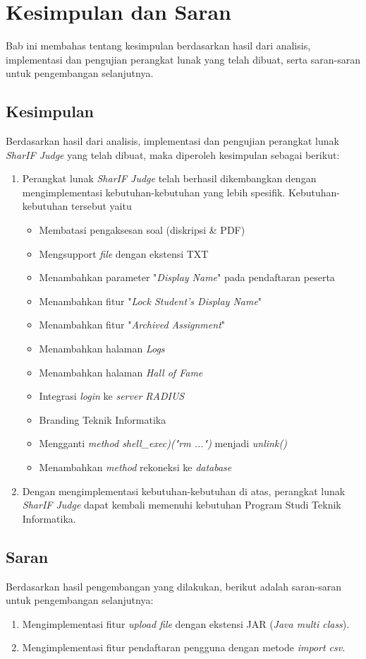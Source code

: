 \chapter{Kesimpulan dan Saran}
\label{chap:kesimpulan dan saran}

Bab ini membahas tentang kesimpulan berdasarkan hasil dari analisis, implementasi dan pengujian perangkat lunak yang telah dibuat, serta saran-saran untuk pengembangan selanjutnya.

\section{Kesimpulan}
Berdasarkan hasil dari analisis, implementasi dan pengujian perangkat lunak \textit{SharIF Judge} yang telah dibuat, maka diperoleh kesimpulan sebagai berikut:
\begin{enumerate}
	\item Perangkat lunak \textit{SharIF Judge} telah berhasil dikembangkan dengan mengimplementasi kebutuhan-kebutuhan yang lebih spesifik. Kebutuhan-kebutuhan tersebut yaitu
	\begin{itemize}
		\item Membatasi pengaksesan soal (diskripsi \& PDF)
		\item Mengsupport \textit{file} dengan ekstensi TXT
		\item Menambahkan parameter "\textit{Display Name}" pada pendaftaran peserta
		\item Menambahkan fitur "\textit{Lock Student's Display Name}"
		\item Menambahkan fitur "\textit{Archived Assignment}"
		\item Menambahkan halaman \textit{Logs}
		\item Menambahkan halaman \textit{Hall of Fame}
		\item Integrasi \textit{login} ke \textit{server RADIUS}
		\item Branding Teknik Informatika
		\item Mengganti \textit{method shell\_exec)("rm ...")} menjadi\textit{ unlink()}
		\item Menambahkan \textit{method} rekoneksi ke \textit{database}
	\end{itemize}

	\item Dengan mengimplementasi kebutuhan-kebutuhan di atas, perangkat lunak \textit{SharIF Judge} dapat kembali memenuhi kebutuhan Program Studi Teknik Informatika.
\end{enumerate}

\section{Saran}
Berdasarkan hasil pengembangan yang dilakukan, berikut adalah saran-saran untuk pengembangan selanjutnya:
\begin{enumerate}
	\item Mengimplementasi fitur \textit{upload file} dengan ekstensi JAR (\textit{Java multi class}).
	\item Mengimplementasi fitur pendaftaran pengguna dengan metode \textit{import csv}.
\end{enumerate}